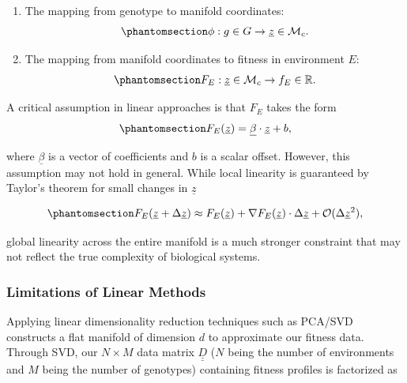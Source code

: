 \documentclass[
]{scrartcl}
\begin{document}
\begin{refsection}
\begin{enumerate}
\def\labelenumi{\arabic{enumi}.}
\item
  The mapping from genotype to manifold coordinates:
  \begin{equation}\phantomsection\label{eq-geno-to-manifold}{
  \phi: g \in G \to \underline{z} \in \mathcal{M}_{c}.
  }\end{equation}
\item
  The mapping from manifold coordinates to fitness in environment \(E\):
  \begin{equation}\phantomsection\label{eq-manifold-to-fitness}{
  F_{E}: \underline{z} \in \mathcal{M}_c \to f_{E} \in \mathbb{R}.
  }\end{equation}
\end{enumerate}

A critical assumption in linear approaches is that \(F_E\) takes the
form \begin{equation}\phantomsection\label{eq-linear-fitness}{
F_E(\underline{z}) = \underline{\beta} \cdot \underline{z} + b,
}\end{equation}

where \(\underline{\beta}\) is a vector of coefficients and \(b\) is a
scalar offset. However, this assumption may not hold in general. While
local linearity is guaranteed by Taylor's theorem for small changes in
\(\underline{z}\)

\begin{equation}\phantomsection\label{eq-taylor}{
F_E(\underline{z} + \Delta\underline{z}) \approx 
F_E({\underline{z}}) + 
\nabla F_E(\underline{z}) \cdot \Delta \underline{z} + 
\mathcal{O}(\Delta\underline{z}^2),
}\end{equation}

global linearity across the entire manifold is a much stronger
constraint that may not reflect the true complexity of biological
systems.

\subsubsection{Limitations of Linear
Methods}\label{limitations-of-linear-methods}

Applying linear dimensionality reduction techniques such as PCA/SVD
constructs a flat manifold of dimension \(d\) to approximate our fitness
data. Through SVD, our \(N \times M\) data matrix
\(\underline{\underline{D}}\) (\(N\) being the number of environments
and \(M\) being the number of genotypes) containing fitness profiles is
factorized as


\end{refsection}
\end{document}
